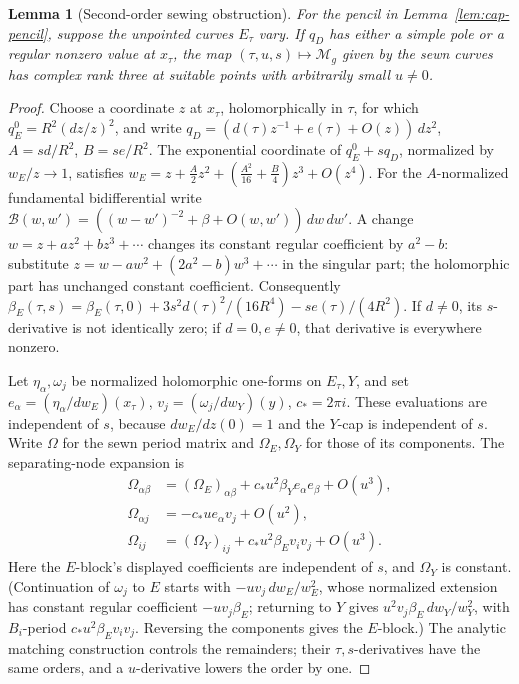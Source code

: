 \documentclass[12pt]{article}
\newcommand{\M}{\mathcal M}
\newtheorem{lemma}[theorem]{Lemma}
\theoremstyle{remark}
\begin{document}
\begin{lemma}[Second-order sewing obstruction]\label{lem:sewing}
For the pencil in Lemma~\ref{lem:cap-pencil}, suppose
the unpointed curves \(E_\tau\) vary.
If \(q_D\) has either a simple pole or a regular nonzero
value at \(x_\tau\), the map \((\tau,u,s)\mapsto\M_g\) given by the
sewn curves has complex rank three at suitable points with
arbitrarily small \(u\ne0\).
\end{lemma}
\begin{proof}
Choose a coordinate \(z\) at \(x_\tau\), holomorphically
in \(\tau\), for which \(q_E^0=R^2(dz/z)^2\), and write
\(q_D=(d(\tau)z^{-1}+e(\tau)+O(z))\,dz^2\),
\(A=sd/R^2\), \(B=se/R^2\).
The exponential coordinate of \(q_E^0+s q_D\), normalized
by \(w_E/z\to1\), satisfies
\(w_E=z+\frac A2z^2+(\frac{A^2}{16}+\frac B4)z^3+O(z^4)\).
For the \(A\)-normalized fundamental bidifferential write
\(\mathcal B(w,w')=((w-w')^{-2}+\beta+O(w,w'))\,dw\,dw'\).
A change \(w=z+az^2+bz^3+\cdots\) changes its constant
regular coefficient by \(a^2-b\): substitute
\(z=w-aw^2+(2a^2-b)w^3+\cdots\) in the singular part;
the holomorphic part has unchanged constant coefficient.
Consequently
\(\beta_E(\tau,s)=\beta_E(\tau,0)+3s^2d(\tau)^2/(16R^4)
-se(\tau)/(4R^2)\).
If \(d\ne0\), its \(s\)-derivative is not identically
zero; if \(d=0,e\ne0\), that derivative is everywhere
nonzero.

Let \(\eta_\alpha,\omega_j\) be normalized holomorphic
one-forms on \(E_\tau,Y\), and set
\(e_\alpha=(\eta_\alpha/dw_E)(x_\tau)\),
\(v_j=(\omega_j/dw_Y)(y)\), \(c_*=2\pi i\).
These evaluations are independent of \(s\), because
\(dw_E/dz(0)=1\) and the \(Y\)-cap is independent of \(s\).
Write \(\Omega\) for the sewn period matrix and
\(\Omega_E,\Omega_Y\) for those of its components.
The separating-node expansion is
\begin{align}
 \Omega_{\alpha\beta}
    &=(\Omega_E)_{\alpha\beta}
       +c_*u^2\beta_Y e_\alpha e_\beta+O(u^3),\nonumber\\
 \Omega_{\alpha j}
    &=-c_*u e_\alpha v_j+O(u^2),\label{eq:general-periods}\\
 \Omega_{ij}
    &=(\Omega_Y)_{ij}
       +c_*u^2\beta_E v_i v_j+O(u^3).\nonumber
\end{align}
Here the \(E\)-block's displayed coefficients are independent
of \(s\), and \(\Omega_Y\) is constant.
(Continuation of \(\omega_j\) to \(E\) starts with
\(-uv_j\,dw_E/w_E^2\), whose normalized extension has
constant regular coefficient \(-uv_j\beta_E\); returning to \(Y\)
gives \(u^2v_j\beta_E\,dw_Y/w_Y^2\), with \(B_i\)-period
\(c_*u^2\beta_Ev_iv_j\). Reversing the components gives the
\(E\)-block.) The analytic matching construction
\cite[Theorem 3.3, Section 5.1.1]{HuNorton} controls the
remainders; their \(\tau,s\)-derivatives have the same
orders, and a \(u\)-derivative lowers the order by one.


\end{proof}
\end{document}
